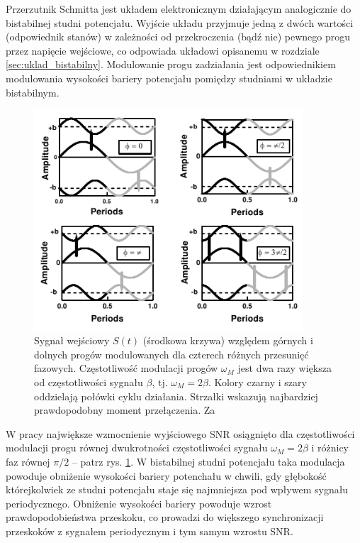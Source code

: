   Przerzutnik Schmitta jest układem elektronicznym działającym analogicznie do bistabilnej studni potencjału. Wyjście układu przyjmuje jedną z dwóch wartości (odpowiednik stanów) w zależności od przekroczenia (bądź nie) pewnego progu przez napięcie wejściowe, co odpowiada układowi opisanemu w rozdziale \ref{sec:uklad_bistabilny}. Modulowanie progu zadziałania jest odpowiednikiem modulowania wysokości bariery potencjału pomiędzy studniami w układzie bistabilnym.

  \begin{figure}
    \includegraphics[width=100mm]{images/gammaitoni_2.png}
    \caption{Sygnał wejściowy $S(t)$ (środkowa krzywa) względem górnych i dolnych progów modulowanych dla czterech różnych przesunięć fazowych. Częstotliwość modulacji progów $\omega_M$ jest dwa razy większa od częstotliwości sygnału $\beta$, tj. $\omega_M = 2 \beta$. Kolory czarny i szary oddzielają połówki cyklu działania. Strzałki wskazują najbardziej prawdopodobny moment przełączenia. Za \cite{gammaitoni}}
    \label{fig:graphics:gammaitoni:fig2}
  \end{figure}

  W pracy \cite{gammaitoni} największe wzmocnienie wyjściowego SNR osiągnięto dla częstotliwości modulacji progu równej dwukrotności częstotliwości sygnału $\omega_M = 2 \beta$ i różnicy faz równej $\pi/2$ -- patrz rys. \ref{fig:graphics:gammaitoni:fig2}.
  W bistabilnej studni potencjału taka modulacja powoduje obniżenie wysokości bariery potenchału w chwili, gdy głębokość którejkolwiek ze studni potencjału staje się najmniejsza pod wpływem sygnału periodycznego. Obniżenie wysokości bariery powoduje wzrost prawdopodobieństwa przeskoku, co prowadzi do większego synchronizacji przeskoków z sygnałem periodycznym i tym samym wzrostu SNR.


